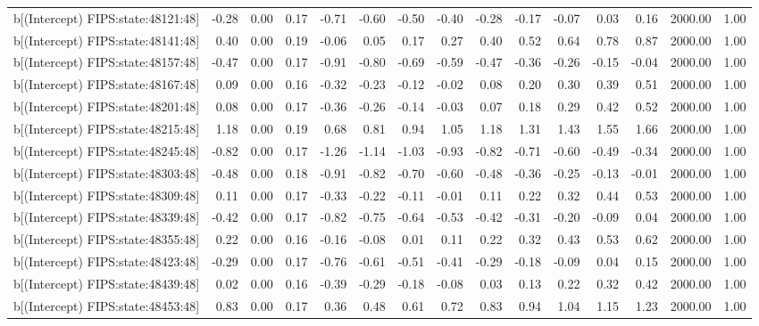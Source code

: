 \begin{table}[ht]
\begin{tabular}{rrrrrrrrrrrrrrr}
  b[(Intercept) FIPS:state:48121:48] & -0.28 & 0.00 & 0.17 & -0.71 & -0.60 & -0.50 & -0.40 & -0.28 & -0.17 & -0.07 & 0.03 & 0.16 & 2000.00 & 1.00 \\ 
  b[(Intercept) FIPS:state:48141:48] & 0.40 & 0.00 & 0.19 & -0.06 & 0.05 & 0.17 & 0.27 & 0.40 & 0.52 & 0.64 & 0.78 & 0.87 & 2000.00 & 1.00 \\ 
  b[(Intercept) FIPS:state:48157:48] & -0.47 & 0.00 & 0.17 & -0.91 & -0.80 & -0.69 & -0.59 & -0.47 & -0.36 & -0.26 & -0.15 & -0.04 & 2000.00 & 1.00 \\ 
  b[(Intercept) FIPS:state:48167:48] & 0.09 & 0.00 & 0.16 & -0.32 & -0.23 & -0.12 & -0.02 & 0.08 & 0.20 & 0.30 & 0.39 & 0.51 & 2000.00 & 1.00 \\ 
  b[(Intercept) FIPS:state:48201:48] & 0.08 & 0.00 & 0.17 & -0.36 & -0.26 & -0.14 & -0.03 & 0.07 & 0.18 & 0.29 & 0.42 & 0.52 & 2000.00 & 1.00 \\ 
  b[(Intercept) FIPS:state:48215:48] & 1.18 & 0.00 & 0.19 & 0.68 & 0.81 & 0.94 & 1.05 & 1.18 & 1.31 & 1.43 & 1.55 & 1.66 & 2000.00 & 1.00 \\ 
  b[(Intercept) FIPS:state:48245:48] & -0.82 & 0.00 & 0.17 & -1.26 & -1.14 & -1.03 & -0.93 & -0.82 & -0.71 & -0.60 & -0.49 & -0.34 & 2000.00 & 1.00 \\ 
  b[(Intercept) FIPS:state:48303:48] & -0.48 & 0.00 & 0.18 & -0.91 & -0.82 & -0.70 & -0.60 & -0.48 & -0.36 & -0.25 & -0.13 & -0.01 & 2000.00 & 1.00 \\ 
  b[(Intercept) FIPS:state:48309:48] & 0.11 & 0.00 & 0.17 & -0.33 & -0.22 & -0.11 & -0.01 & 0.11 & 0.22 & 0.32 & 0.44 & 0.53 & 2000.00 & 1.00 \\ 
  b[(Intercept) FIPS:state:48339:48] & -0.42 & 0.00 & 0.17 & -0.82 & -0.75 & -0.64 & -0.53 & -0.42 & -0.31 & -0.20 & -0.09 & 0.04 & 2000.00 & 1.00 \\ 
  b[(Intercept) FIPS:state:48355:48] & 0.22 & 0.00 & 0.16 & -0.16 & -0.08 & 0.01 & 0.11 & 0.22 & 0.32 & 0.43 & 0.53 & 0.62 & 2000.00 & 1.00 \\ 
  b[(Intercept) FIPS:state:48423:48] & -0.29 & 0.00 & 0.17 & -0.76 & -0.61 & -0.51 & -0.41 & -0.29 & -0.18 & -0.09 & 0.04 & 0.15 & 2000.00 & 1.00 \\ 
  b[(Intercept) FIPS:state:48439:48] & 0.02 & 0.00 & 0.16 & -0.39 & -0.29 & -0.18 & -0.08 & 0.03 & 0.13 & 0.22 & 0.32 & 0.42 & 2000.00 & 1.00 \\ 
  b[(Intercept) FIPS:state:48453:48] & 0.83 & 0.00 & 0.17 & 0.36 & 0.48 & 0.61 & 0.72 & 0.83 & 0.94 & 1.04 & 1.15 & 1.23 & 2000.00 & 1.00 \\ 

\end{tabular}
\end{table}
